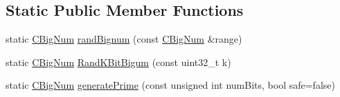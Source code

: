 \subsection*{Static Public Member Functions}
\begin{DoxyCompactItemize}
\item 
static \mbox{\hyperlink{class_c_big_num}{C\+Big\+Num}} \mbox{\hyperlink{class_c_big_num_a83e20522f042dd2b738bd26e21605e3b}{rand\+Bignum}} (const \mbox{\hyperlink{class_c_big_num}{C\+Big\+Num}} \&range)
\item 
static \mbox{\hyperlink{class_c_big_num}{C\+Big\+Num}} \mbox{\hyperlink{class_c_big_num_a200174f8261baebceb64b24a2d91f33f}{Rand\+K\+Bit\+Bigum}} (const uint32\+\_\+t k)
\item 
static \mbox{\hyperlink{class_c_big_num}{C\+Big\+Num}} \mbox{\hyperlink{class_c_big_num_a4579e2136563a20844d60d9fe513e1fe}{generate\+Prime}} (const unsigned int num\+Bits, bool safe=false)
\end{DoxyCompactItemize}
